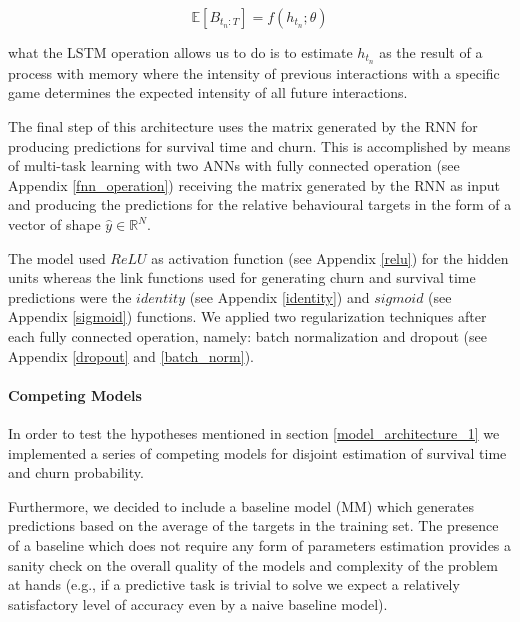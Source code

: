 \begin{equation}
\label{rnn_1_exp}
   \mathbb{E}[B_{t_n : T}] = f(h_{t_n}; \theta)
\end{equation}

what the LSTM operation allows us to do is to estimate $h_{t_n}$ as the result of a process with memory where the intensity of previous interactions with a specific game determines the expected intensity of all future interactions. 

The final step of this architecture uses the matrix generated by the RNN for producing predictions for survival time and churn. This is accomplished by means of multi-task learning with two ANNs with fully connected operation (see Appendix \ref{fnn_operation}) receiving the matrix generated by the RNN as input and producing the predictions for the relative behavioural targets in the form of a vector of shape $\hat{y} \in \mathbb{R}^{N}$. 

The model used $ReLU$ as activation function (see Appendix \ref{relu}) for the hidden units whereas the link functions used for generating churn and survival time predictions were the $identity$ (see Appendix \ref{identity}) and $sigmoid$ (see Appendix \ref{sigmoid}) functions. We applied two regularization techniques after each fully connected operation, namely: batch normalization \cite{ioffe2015batch} and dropout \cite{srivastava2014dropout} (see Appendix \ref{dropout} and \ref{batch_norm}).

\paragraph*{Competing Models}
\label{competing_models_1}
In order to test the hypotheses mentioned in section \ref{model_architecture_1} we implemented a series of competing models for disjoint estimation of survival time and churn probability. 

Furthermore, we decided to include a baseline model (MM) which generates predictions based on the average of the targets in the training set. The presence of a baseline which does not require any form of parameters estimation provides a sanity check on the overall quality of the models and complexity of the problem at hands (e.g., if a  predictive task is trivial to solve we expect a relatively satisfactory level of accuracy even by a naive baseline model). 

